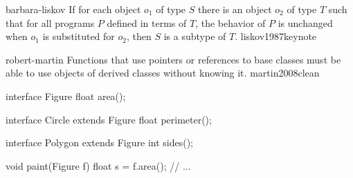 \documentclass{article}
\begin{document}

\pptToc


\lnQuote
  {barbara-liskov}
  {If for each object $o_1$ of type $S$ there is an object $o_2$ of type $T$ such that for all programs $P$ defined in terms of $T$, the behavior of $P$ is unchanged when $o_1$ is substituted for $o_2$, then $S$ is a subtype of $T$.}
  {liskov1987keynote}

\lnQuote
  {robert-martin}
  {Functions that use pointers or references to base classes must be able to use objects of derived classes without knowing it.}
  {martin2008clean}

\begin{lnSnippet}
interface Figure
  float area();

interface Circle extends Figure
  float perimeter();

interface Polygon extends Figure
  int sides();

void paint(Figure f)
  float s = f.area();
  // ...
\end{lnSnippet}
\end{document}
